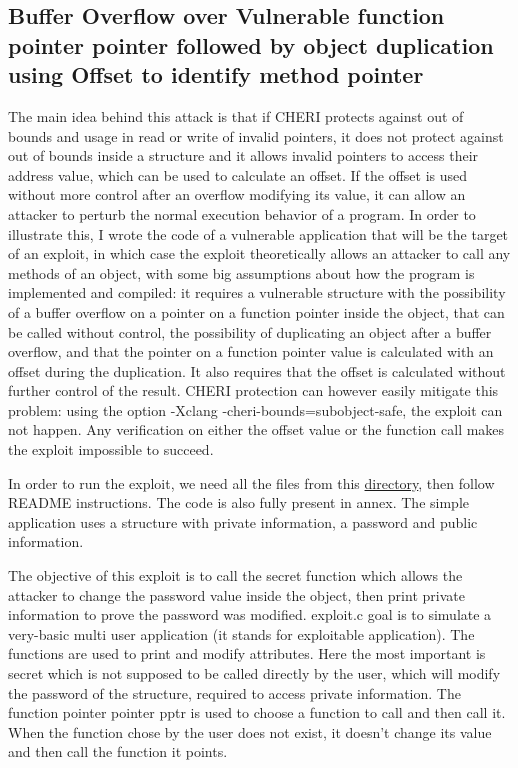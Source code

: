 \documentclass[a4paper, 11pt]{article}
\begin{document}
\subsection{Buffer Overflow over Vulnerable function pointer pointer followed by object duplication using Offset to identify method pointer}

The main idea behind this attack is that if CHERI protects against out of bounds and usage in read or write of invalid pointers, it does not protect against out of bounds inside a structure and it allows invalid pointers to access their address value, which can be used to calculate an offset. If the offset is used without more control after an overflow modifying its value, it can allow an attacker to perturb the normal execution behavior of a program.
In order to illustrate this, I wrote the code of a vulnerable application that will be the target of an exploit, in which case the exploit theoretically allows an attacker to call any methods of an object, with some big assumptions about how the program is implemented and compiled: it requires a vulnerable structure with the possibility of a buffer overflow on a pointer on a function pointer inside the object, that can be called without control, the possibility of duplicating an object after a buffer overflow, and that the pointer on a function pointer value is calculated with an offset during the duplication. It also requires that the offset is calculated without further control of the result. 
CHERI protection can however easily mitigate this problem: using the option -Xclang -cheri-bounds=subobject-safe, the exploit can not happen. Any verification on either the offset value or the function call makes the exploit impossible to succeed.

In order to run the exploit, we need all the files from this \href{https://github.com/pglbgit2/exploit.git}{directory}, then follow README instructions. The code is also fully present in annex.
The simple application uses a structure with private information, a password and public information.


The objective of this exploit is to call the secret function which allows the attacker to change the password value inside the object, then print private information to prove the password was modified.
exploit.c goal is to simulate a very-basic multi user application (it stands for exploitable application). 
The functions are used to print and modify attributes. Here the most important is secret which is not supposed to be called directly by the user, which will modify the password of the structure, required to access private information. The function pointer pointer pptr is used to choose a function to call and then call it. When the function chose by the user does not exist, it doesn't change its value and then call the function it points.
\end{document}
